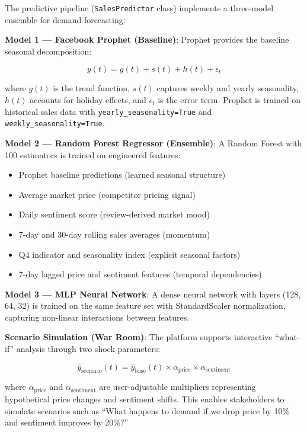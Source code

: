 \documentclass[conference]{IEEEtran}
\begin{document}
The predictive pipeline (\texttt{SalesPredictor} class) implements a three-model ensemble for demand forecasting:

\textbf{Model 1 --- Facebook Prophet (Baseline)}: Prophet provides the baseline seasonal decomposition:

\begin{equation}
y(t) = g(t) + s(t) + h(t) + \epsilon_t
\label{eq:prophet}
\end{equation}

where $g(t)$ is the trend function, $s(t)$ captures weekly and yearly seasonality, $h(t)$ accounts for holiday effects, and $\epsilon_t$ is the error term. Prophet is trained on historical sales data with \texttt{yearly\_seasonality=True} and \texttt{weekly\_seasonality=True}.

\textbf{Model 2 --- Random Forest Regressor (Ensemble)}: A Random Forest with 100 estimators is trained on engineered features:

\begin{itemize}
    \item Prophet baseline predictions (learned seasonal structure)
    \item Average market price (competitor pricing signal)
    \item Daily sentiment score (review-derived market mood)
    \item 7-day and 30-day rolling sales averages (momentum)
    \item Q4 indicator and seasonality index (explicit seasonal factors)
    \item 7-day lagged price and sentiment features (temporal dependencies)
\end{itemize}

\textbf{Model 3 --- MLP Neural Network}: A dense neural network with layers (128, 64, 32) is trained on the same feature set with StandardScaler normalization, capturing non-linear interactions between features.

\textbf{Scenario Simulation (War Room)}: The platform supports interactive ``what-if'' analysis through two shock parameters:

\begin{equation}
\hat{y}_{\text{scenario}}(t) = \hat{y}_{\text{base}}(t) \times \alpha_{\text{price}} \times \alpha_{\text{sentiment}}
\label{eq:scenario}
\end{equation}

where $\alpha_{\text{price}}$ and $\alpha_{\text{sentiment}}$ are user-adjustable multipliers representing hypothetical price changes and sentiment shifts. This enables stakeholders to simulate scenarios such as ``What happens to demand if we drop price by 10\% and sentiment improves by 20\%?''
\end{document}
